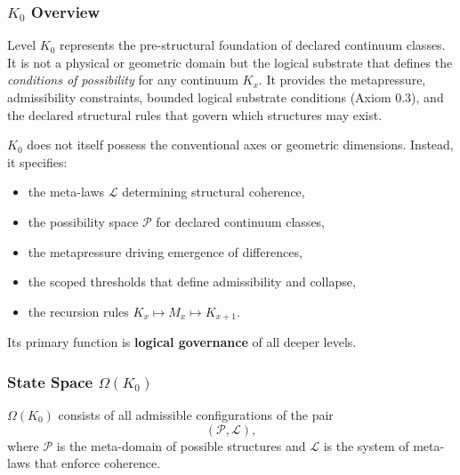 

\subsubsection{\texorpdfstring{$K_0$}{K_0} Overview}
\label{sec:k0-overview}

Level $K_0$ represents the pre-structural foundation of declared continuum classes.
It is not a physical or geometric domain but the logical substrate that
defines the \emph{conditions of possibility} for any continuum $K_x$.
It provides the metapressure, admissibility constraints, bounded logical substrate conditions (Axiom 0.3), and the declared structural rules that govern which
structures may exist.

$K_0$ does not itself possess the conventional axes or geometric
dimensions.
Instead, it specifies:
\begin{itemize}
    \item the meta-laws $\mathcal{L}$ determining structural coherence,
    \item the possibility space $\mathcal{P}$ for declared continuum classes,
    \item the metapressure driving emergence of differences,
    \item the scoped thresholds that define admissibility and collapse,
    \item the recursion rules $K_x \mapsto M_x \mapsto K_{x+1}$.
\end{itemize}

Its primary function is \textbf{logical governance} of all deeper
levels.

\subsubsection{State Space \texorpdfstring{$\Omega(K_0)$}{\Omega(K_0)}}

$\Omega(K_0)$ consists of all admissible configurations of the pair
\[
(\mathcal{P}, \mathcal{L}),
\]
where $\mathcal{P}$ is the meta-domain of possible structures and
$\mathcal{L}$ is the system of meta-laws that enforce coherence.

